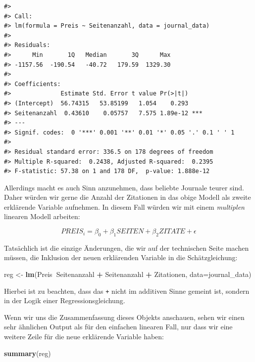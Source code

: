\documentclass[]{book}
\newenvironment{Shaded}{\begin{snugshade}}{\end{snugshade}}
\newcommand{\KeywordTok}[1]{\textcolor[rgb]{0.13,0.29,0.53}{\textbf{#1}}}
\newcommand{\DataTypeTok}[1]{\textcolor[rgb]{0.13,0.29,0.53}{#1}}
\newcommand{\StringTok}[1]{\textcolor[rgb]{0.31,0.60,0.02}{#1}}
\newcommand{\OperatorTok}[1]{\textcolor[rgb]{0.81,0.36,0.00}{\textbf{#1}}}
\newcommand{\NormalTok}[1]{#1}
\begin{document}
\begin{verbatim}
#> 
#> Call:
#> lm(formula = Preis ~ Seitenanzahl, data = journal_data)
#> 
#> Residuals:
#>      Min       1Q   Median       3Q      Max 
#> -1157.56  -190.54   -40.72   179.59  1329.30 
#> 
#> Coefficients:
#>              Estimate Std. Error t value Pr(>|t|)    
#> (Intercept)  56.74315   53.85199   1.054    0.293    
#> Seitenanzahl  0.43610    0.05757   7.575 1.89e-12 ***
#> ---
#> Signif. codes:  0 '***' 0.001 '**' 0.01 '*' 0.05 '.' 0.1 ' ' 1
#> 
#> Residual standard error: 336.5 on 178 degrees of freedom
#> Multiple R-squared:  0.2438, Adjusted R-squared:  0.2395 
#> F-statistic: 57.38 on 1 and 178 DF,  p-value: 1.888e-12
\end{verbatim}

Allerdings macht es auch Sinn anzunehmen, dass beliebte Journale teurer
sind. Daher würden wir gerne die Anzahl der Zitationen in das obige
Modell als zweite erklärende Variable aufnehmen. In diesem Fall würden
wir mit einem \emph{multiplen} linearen Modell arbeiten:

\[PREIS_i = \beta_0 + \beta_1 SEITEN + \beta_2 ZITATE + \epsilon\]

Tatsächlich ist die einzige Änderungen, die wir auf der technischen
Seite machen müssen, die Inklusion der neuen erklärenden Variable in die
Schätzgleichung:

\begin{Shaded}
\begin{Highlighting}[]
\NormalTok{reg <-}\StringTok{ }\KeywordTok{lm}\NormalTok{(Preis}\OperatorTok{~}\NormalTok{Seitenanzahl }\OperatorTok{+}\StringTok{ }\NormalTok{Seitenanzahl }\OperatorTok{+}\StringTok{ }\NormalTok{Zitationen, }\DataTypeTok{data=}\NormalTok{journal_data)}
\end{Highlighting}
\end{Shaded}

Hierbei ist zu beachten, dass das \texttt{+} nicht im additiven Sinne
gemeint ist, sondern in der Logik einer Regressionsgleichung.

Wenn wir uns die Zusammenfassung dieses Objekts anschauen, sehen wir
einen sehr ähnlichen Output als für den einfachen linearen Fall, nur
dass wir eine weitere Zeile für die neue erklärende Variable haben:

\begin{Shaded}
\begin{Highlighting}[]
\KeywordTok{summary}\NormalTok{(reg)}
\end{Highlighting}
\end{Shaded}
\end{document}

